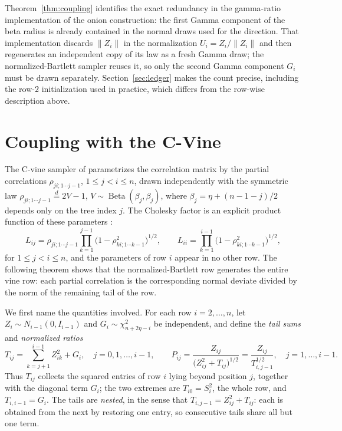 \documentclass[12pt,english]{article}
\theoremstyle{plain} %
\theoremstyle{definition} %
\theoremstyle{remark} %
\begin{document}
Theorem~\ref{thm:coupling} identifies the exact redundancy in the gamma-ratio implementation of the onion construction: the first Gamma component of the beta radius is already contained in the normal draws used for the direction. That implementation discards $\|Z_i\|$ in the normalization $U_i=Z_i/\|Z_i\|$ and then regenerates an independent copy of its law as a fresh Gamma draw; the normalized-Bartlett sampler reuses it, so only the second Gamma component $G_i$ must be drawn separately. Section~\ref{sec:ledger} makes the count precise, including the row-$2$ initialization used in practice, which differs from the row-wise description above.

\section{Coupling with the C-Vine}
\label{sec:vine_equivalence}

The C-vine sampler of \citet{LewandowskiKurowickaJoe:2009} parametrizes the correlation matrix by the partial correlations $\rho_{ji;1\cdots j-1}$, $1\leq j<i\leq n$, drawn independently with the symmetric law $\rho_{ji;1\cdots j-1}\overset{d}{=}2V-1$, $V\sim\operatorname{Beta}(\beta_j,\beta_j)$, where $\beta_j=\eta+(n-1-j)/2$ depends only on the tree index $j$. The Cholesky factor is an explicit product function of these parameters \citep[Appendix~A.4]{JoeKurowicka:2026}:
\begin{equation}
\label{eq:vine_cholesky}
L_{ij}=\rho_{ji;1\cdots j-1}\prod_{k=1}^{j-1}\bigl(1-\rho_{ki;1\cdots k-1}^2\bigr)^{1/2},
\qquad
L_{ii}=\prod_{k=1}^{i-1}\bigl(1-\rho_{ki;1\cdots k-1}^2\bigr)^{1/2},
\end{equation}
for $1\leq j<i\leq n$, and the parameters of row $i$ appear in no other row. The following theorem shows that the normalized-Bartlett row generates the entire vine row: each partial correlation is the corresponding normal deviate divided by the norm of the remaining tail of the row.

We first name the quantities involved. For each row $i=2,\ldots,n$, let $Z_i\sim N_{i-1}(0,I_{i-1})$ and $G_i\sim\chi^2_{n+2\eta-i}$ be independent, and define the \emph{tail sums} and \emph{normalized ratios}
\begin{equation}
\label{eq:tails}
T_{ij}=\sum_{k=j+1}^{i-1}Z_{ik}^2+G_i,
\quad j=0,1,\ldots,i-1,
\qquad
P_{ij}=\frac{Z_{ij}}{\bigl(Z_{ij}^2+T_{ij}\bigr)^{1/2}}=\frac{Z_{ij}}{T_{i,j-1}^{1/2}},
\quad j=1,\ldots,i-1.
\end{equation}
Thus $T_{ij}$ collects the squared entries of row $i$ lying beyond position $j$, together with the diagonal term $G_i$; the two extremes are $T_{i0}=S_i^2$, the whole row, and $T_{i,i-1}=G_i$. The tails are \emph{nested}, in the sense that $T_{i,j-1}=Z_{ij}^2+T_{ij}$: each is obtained from the next by restoring one entry, so consecutive tails share all but one term.
\end{document}
